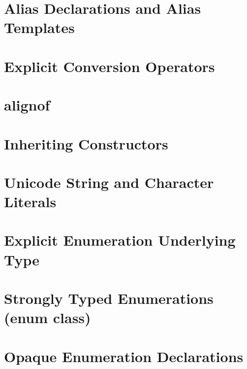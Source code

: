 \newpage
\section[Alias Declarations and Alias Templates]{Alias Declarations and Alias Templates}\label{alias-declarations-and-alias-templates}


\newpage
\section[Explicit Conversions]{Explicit Conversion Operators}\label{explicit-conversion-operators}


\newpage
\section[{\tt alignof}]{{\SecCode alignof}}\label{alignof}


\newpage
\section[Inheriting Constructors]{Inheriting Constructors}\label{ctorinheriting}\label{inheriting-constructors}


\newpage
\section[Unicode String and Character Literals]{Unicode String and Character Literals}\label{unicode-string-and-character-literals}


\newpage
\section[Explicit Enumeration Underlying Type]{Explicit Enumeration Underlying Type}\label{explicit-enumeration-underlying-type}


\newpage
\section[{\tt enum} {\tt class}]{Strongly Typed Enumerations ({\SecCode enum} {\SecCode class})}\label{enumclass}


\newpage
\section[Opaque Enumeration Declarations]{Opaque Enumeration Declarations}\label{enumopaque}



